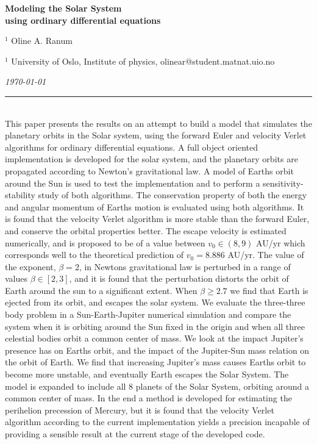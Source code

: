 \documentclass[%
reprint,nofootinbib,
amsmath,amssymb,
aps,
]{revtex4-1}
\newcommand{\HRule}{\rule{\textwidth}{0.5mm}}
\begin{document}
\onecolumngrid

\begin{center}
	\large\textbf{Modeling the Solar System \\ using ordinary differential equations}
\end{center}
\vspace{5mm}

\begin{center}
	\small{$^1$ Oline A. Ranum}\\
\end{center}

\begin{center}
	\small{$^1$ University of Oslo, Institute of physics, 
		olinear@student.matnat.uio.no}
\end{center}

\begin{center}
	\textit{\today}
\end{center}
\vspace{5mm}
\noindent 
\HRule \vspace{0.1mm}\\
	 This paper presents the results on an attempt to build a model that simulates the planetary orbits in the Solar system, using the forward Euler and velocity Verlet algorithms for ordinary differential equations. A full object oriented implementation is developed for the solar system, and the planetary orbits are propagated according to Newton's gravitational law. A model of Earths orbit around the Sun is used to test the implementation and to perform a sensitivity-stability study of both algorithms. The conservation property of both the energy and angular momentum of Earths motion is evaluated using both algorithms. It is found that the velocity Verlet algorithm is more stable than the forward Euler, and conserve the  orbital properties better. The escape velocity is estimated numerically, and is proposed to be of a value between $v_0\in(8,9)$ AU/yr which corresponds well to the theoretical prediction of $v_0 = 8.886$ AU/yr. The value of the exponent, $\beta = 2$, in Newtons gravitational law is perturbed in a range of values $\beta\in[2,3]$, and it is found that the perturbation distorts the orbit of Earth around the sun to a significant extent. When $\beta \geq 2.7$ we find that Earth is ejected from its orbit, and escapes the solar system. We evaluate the three-three body problem in a Sun-Earth-Jupiter numerical simulation and compare the system when it is orbiting around the Sun fixed in the origin and when all three celestial bodies orbit a common center of mass. We look at the impact Jupiter's presence has on Earths orbit, and the impact of the Jupiter-Sun mass relation on the orbit of Earth. We find that increasing Jupiter's mass causes Earths orbit to become more unstable, and eventually Earth escapes the Solar System. The model is expanded to include all 8 planets of the Solar System, orbiting around a common center of mass. In the end a method is developed for estimating the perihelion precession of Mercury, but it is found that the velocity Verlet algorithm according to the current implementation yields a precision incapable of providing a sensible result at the current stage of the developed code.    
\end{document}
